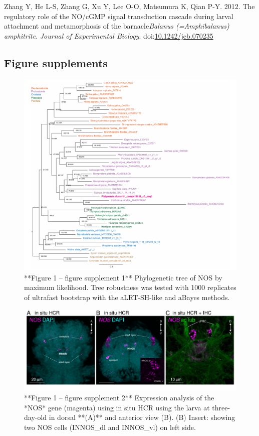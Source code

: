 \documentclass[
  10pt,
  onecolumn]{article}
\newlength{\cslhangindent}
\newlength{\cslentryspacingunit} %
\newenvironment{CSLReferences}[2] %
 {%
  \setlength{\parindent}{0pt}
  \ifodd #1
  \let\oldpar\par
  \def\par{\hangindent=\cslhangindent\oldpar}
  \fi
  \setlength{\parskip}{#2\cslentryspacingunit}
 }%
 {}
\begin{document}
\begin{CSLReferences}{1}{0}
\leavevmode{}%
Zhang Y, He L-S, Zhang G, Xu Y, Lee O-O, Matsumura K, Qian P-Y. 2012.
The regulatory role of the NO/cGMP signal transduction cascade during
larval attachment and metamorphosis of the barnacle{\emph{Balanus
(=Amphibalanus) amphitrite}}. \emph{Journal of Experimental Biology}.
doi:\href{https://doi.org/10.1242/jeb.070235}{10.1242/jeb.070235}

\end{CSLReferences}

\hypertarget{figure-supplements}{%
\subsection{Figure supplements}\label{figure-supplements}}

\begin{figure}
\includegraphics[width=27.78in]{figures/Fig1_sup1} \caption{**Figure 1 -- figure supplement 1**  Phylogenetic tree of NOS by maximum likelihood. Tree robustness was tested with 1000 replicates of ultrafast bootstrap with the aLRT-SH-like and aBayes methods.}\label{fig:unnamed-chunk-8}
\end{figure}

\begin{figure}
\includegraphics[width=16.67in]{figures/Fig1_sup2} \caption{**Figure 1 -- figure supplement 2** Expression analysis of the *NOS* gene (magenta) using in situ HCR using the larva at three-day-old in dorsal **(A)** and anterior view (B). (B) Insert: showing two NOS cells (INNOS_dl and INNOS_vl) on left side.}\label{fig:unnamed-chunk-9}
\end{figure}
\end{document}
